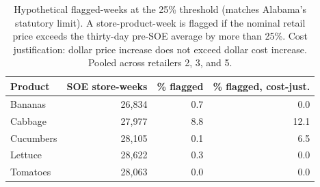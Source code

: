 \begin{table}[!h]
\centering
\caption{\label{tab:flagged_weeks_T25}Hypothetical flagged-weeks at the 25\% threshold (matches Alabama's statutory limit). A store-product-week is flagged if the nominal retail price exceeds the thirty-day pre-SOE average by more than 25\%. Cost justification: dollar price increase does not exceed dollar cost increase. Pooled across retailers 2, 3, and 5.}
\centering
\begin{tabular}[t]{lrrr}
\toprule
Product & SOE store-weeks & \% flagged & \% flagged, cost-just.\\
\midrule
Bananas & 26,834 & 0.7 & 0.0\\
Cabbage & 27,977 & 8.8 & 12.1\\
Cucumbers & 28,105 & 0.1 & 6.5\\
Lettuce & 28,622 & 0.3 & 0.0\\
Tomatoes & 28,063 & 0.0 & 0.0\\
\bottomrule
\end{tabular}
\end{table}
